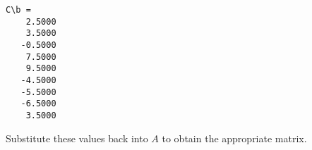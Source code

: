 \documentclass{ximera}
\begin{document}
\begin{exercise}
\begin{solution}
\begin{verbatim}
C\b =
    2.5000
    3.5000
   -0.5000
    7.5000
    9.5000
   -4.5000
   -5.5000
   -6.5000
    3.5000
\end{verbatim}
Substitute these values back into $A$ to obtain the appropriate matrix.



\end{solution}
\end{exercise}
\end{document}
